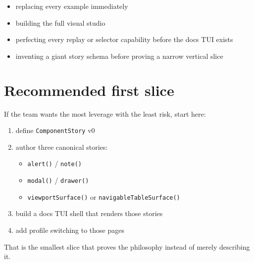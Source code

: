 \begin{itemize}
\tightlist
\item
  replacing every example immediately
\item
  building the full visual studio
\item
  perfecting every replay or selector capability before the docs TUI exists
\item
  inventing a giant story schema before proving a narrow vertical slice
\end{itemize}

\section{Recommended first slice}\label{record-042-recommended-first-slice}

If the team wants the most leverage with the least risk, start here:

\begin{enumerate}
\def\labelenumi{\arabic{enumi}.}
\tightlist
\item
  define \texttt{C\allowbreak{}o\allowbreak{}m\allowbreak{}p\allowbreak{}o\allowbreak{}n\allowbreak{}e\allowbreak{}n\allowbreak{}t\allowbreak{}S\allowbreak{}t\allowbreak{}o\allowbreak{}r\allowbreak{}y} v0
\item
  author three canonical stories:

  \begin{itemize}
  \tightlist
  \item
    \texttt{a\allowbreak{}l\allowbreak{}e\allowbreak{}r\allowbreak{}t\allowbreak{}(\allowbreak{})} / \texttt{n\allowbreak{}o\allowbreak{}t\allowbreak{}e\allowbreak{}(\allowbreak{})}
  \item
    \texttt{m\allowbreak{}o\allowbreak{}d\allowbreak{}a\allowbreak{}l\allowbreak{}(\allowbreak{})} / \texttt{d\allowbreak{}r\allowbreak{}a\allowbreak{}w\allowbreak{}e\allowbreak{}r\allowbreak{}(\allowbreak{})}
  \item
    \texttt{v\allowbreak{}i\allowbreak{}e\allowbreak{}w\allowbreak{}p\allowbreak{}o\allowbreak{}r\allowbreak{}t\allowbreak{}S\allowbreak{}u\allowbreak{}r\allowbreak{}f\allowbreak{}a\allowbreak{}c\allowbreak{}e\allowbreak{}(\allowbreak{})} or \texttt{n\allowbreak{}a\allowbreak{}v\allowbreak{}i\allowbreak{}g\allowbreak{}a\allowbreak{}b\allowbreak{}l\allowbreak{}e\allowbreak{}T\allowbreak{}a\allowbreak{}b\allowbreak{}l\allowbreak{}e\allowbreak{}S\allowbreak{}u\allowbreak{}r\allowbreak{}f\allowbreak{}a\allowbreak{}c\allowbreak{}e\allowbreak{}(\allowbreak{})}
  \end{itemize}
\item
  build a docs TUI shell that renders those stories
\item
  add profile switching to those pages
\end{enumerate}

That is the smallest slice that proves the philosophy instead of merely describing it.

